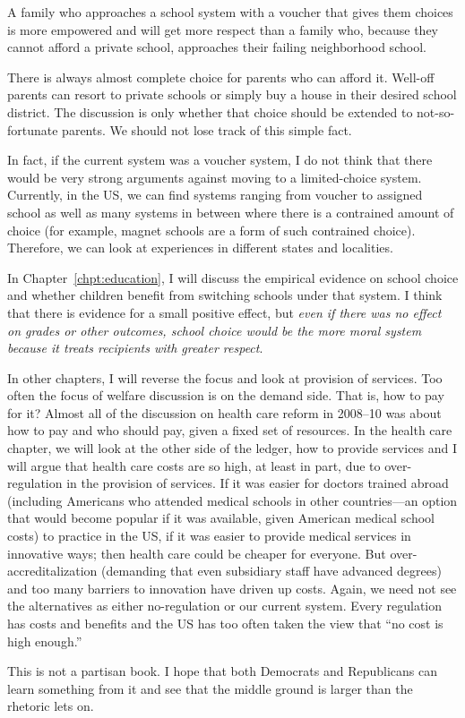 A family who approaches a school system with a voucher that gives them choices
is more empowered and will get more respect than a family who, because they
cannot afford a private school, approaches their failing neighborhood school.

There is always almost complete choice for parents who can afford it. Well-off
parents can resort to private schools or simply buy a house in their desired
school district. The discussion is only whether that choice should be extended
to not-so-fortunate parents. We should not lose track of this simple fact.

In fact, if the current system was a voucher system, I do not think that there
would be very strong arguments against moving to a limited-choice system.
Currently, in the US, we can find systems ranging from voucher to assigned
school as well as many systems in between where there is a contrained amount of
choice (for example, magnet schools are a form of such contrained choice).
Therefore, we can look at experiences in different states and localities.

In Chapter~\ref{chpt:education}, I will discuss the empirical evidence on
school choice and whether children benefit from switching schools under that
system. I think that there is evidence for a small positive effect, but
\emph{even if there was no effect on grades or other outcomes, school choice
would be the more moral system because it treats recipients with greater
respect}.

In other chapters, I will reverse the focus and look at provision of services.
Too often the focus of welfare discussion is on the demand side. That is, how
to pay for it? Almost all of the discussion on health care reform in 2008--10
was about how to pay and who should pay, given a fixed set of resources. In the
health care chapter, we will look at the other side of the ledger, how to
provide services and I will argue that health care costs are so high, at least
in part, due to over-regulation in the provision of services. If it was easier
for doctors trained abroad (including Americans who attended medical schools in
other countries---an option that would become popular if it was available,
given American medical school costs) to practice in the US, if it was easier to
provide medical services in innovative ways; then health care could be cheaper
for everyone. But over-accreditalization (demanding that even subsidiary staff
have advanced degrees) and too many barriers to innovation have driven up
costs. Again, we need not see the alternatives as either no-regulation or our
current system. Every regulation has costs and benefits and the US has too
often taken the view that ``no cost is high enough.''

This is not a partisan book. I hope that both Democrats and Republicans can
learn something from it and see that the middle ground is larger than the
rhetoric lets on.


